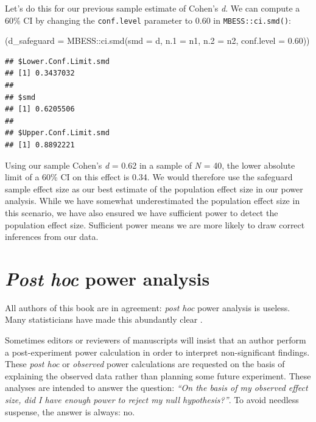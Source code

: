 \documentclass[
]{book}
\newenvironment{Shaded}{\begin{snugshade}}{\end{snugshade}}
\newcommand{\AttributeTok}[1]{\textcolor[rgb]{0.77,0.63,0.00}{#1}}
\newcommand{\FloatTok}[1]{\textcolor[rgb]{0.00,0.00,0.81}{#1}}
\newcommand{\FunctionTok}[1]{\textcolor[rgb]{0.00,0.00,0.00}{#1}}
\newcommand{\NormalTok}[1]{#1}
\newcommand{\SpecialCharTok}[1]{\textcolor[rgb]{0.00,0.00,0.00}{#1}}
\begin{document}
Let's do this for our previous sample estimate of Cohen's \emph{d}. We can compute a 60\% CI by changing the \texttt{conf.level} parameter to 0.60 in \texttt{MBESS::ci.smd()}:

\begin{Shaded}
\begin{Highlighting}[]
\NormalTok{(}\AttributeTok{d\_safeguard =}\NormalTok{ MBESS}\SpecialCharTok{::}\FunctionTok{ci.smd}\NormalTok{(}\AttributeTok{smd =}\NormalTok{ d, }\AttributeTok{n.1 =}\NormalTok{ n1, }\AttributeTok{n.2 =}\NormalTok{ n2, }\AttributeTok{conf.level =} \FloatTok{0.60}\NormalTok{))}
\end{Highlighting}
\end{Shaded}

\begin{verbatim}
## $Lower.Conf.Limit.smd
## [1] 0.3437032
## 
## $smd
## [1] 0.6205506
## 
## $Upper.Conf.Limit.smd
## [1] 0.8892221
\end{verbatim}

Using our sample Cohen's \emph{d} = 0.62 in a sample of \emph{N} = 40, the lower absolute limit of a 60\% CI on this effect is 0.34. We would therefore use the safeguard sample effect size as our best estimate of the population effect size in our power analysis. While we have somewhat underestimated the population effect size in this scenario, we have also ensured we have sufficient power to detect the population effect size. Sufficient power means we are more likely to draw correct inferences from our data.

\hypertarget{post-hoc-power-analysis}{%
\section{\texorpdfstring{\emph{Post hoc} power analysis}{Post hoc power analysis}}\label{post-hoc-power-analysis}}

All authors of this book are in agreement: \emph{post hoc} power analysis is useless. Many statisticians have made this abundantly clear \citep{gelman2019don, Althouse2021}.

Sometimes editors or reviewers of manuscripts will insist that an author perform a post-experiment power calculation in order to interpret non-significant findings. These \emph{post hoc} or \emph{observed} power calculations are requested on the basis of explaining the observed data rather than planning some future experiment. These analyses are intended to answer the question: \emph{``On the basis of my observed effect size, did I have enough power to reject my null hypothesis?''}. To avoid needless suspense, the answer is always: no.
\end{document}
